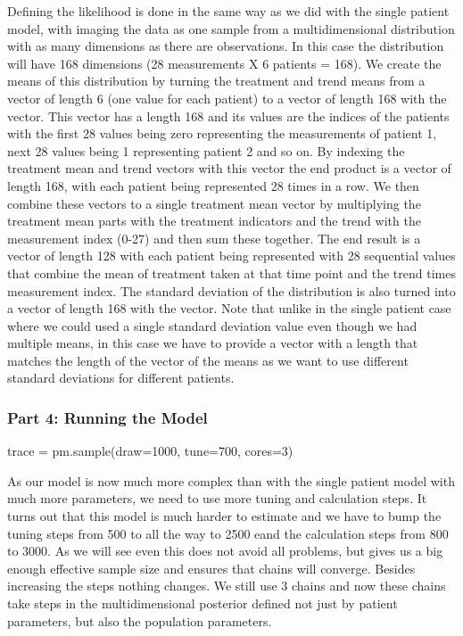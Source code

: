 \documentclass[12pt,a4paper,leqno]{report}
\theoremstyle{plain}
\theoremstyle{definition}
\theoremstyle{remark}
\begin{document}

Defining the likelihood is done in the same way as we did with the single patient model,
with imaging the data as one sample from a multidimensional distribution with as many
dimensions as there are observations. In this case the
distribution will have 168 dimensions (28 measurements X 6 patients = 168). We
create the means of this distribution by turning the treatment and trend means from
a vector of length 6 (one value for each patient) to a vector of length 168 with the
 vector. This vector has a length 168 and its values are the indices of the
patients with the first 28 values being
zero representing the measurements of patient 1, next 28 values being 1 representing
patient 2 and so on. By indexing the treatment mean and trend vectors with this vector the end
product is a vector of length 168, with each patient being represented 28 times
in a row. We then combine these vectors to a single treatment mean vector by multiplying
the treatment mean parts with the treatment indicators and the trend with the
measurement index (0-27) and then sum these together. The end result is a
vector of length 128 with each patient being represented with 28 sequential values that
combine the mean of treatment taken at that time point and the trend times measurement index. The standard
deviation of the distribution is also turned into a vector of length 168 with the
 vector. Note that unlike in the single patient case where we could used a single
standard deviation value even though we had multiple means, in this case we have to
provide a vector with a length that matches the length of the vector of the means as we
want to use different standard deviations for different patients.

\subsubsection*{Part 4: Running the Model}

\bigskip
\begin{pyverbatim}[][fontsize=\footnotesize]
    trace = pm.sample(draw=1000, tune=700, cores=3)
\end{pyverbatim}
\bigskip

As our model is now much more complex than with the single patient model with much
more parameters, we need to use more tuning and calculation steps. It turns out that this model is
much harder to estimate and we have to bump the tuning steps from 500 to all the way to
2500 eand the calculation steps from 800 to 3000. As we will see even this does not
avoid all problems, but gives us a big enough effective sample size and ensures that
chains will converge. Besides increasing the steps nothing changes. We still use 3
chains and now these chains take steps in the multidimensional posterior defined not
just by patient parameters, but also the population parameters.
\end{document}
